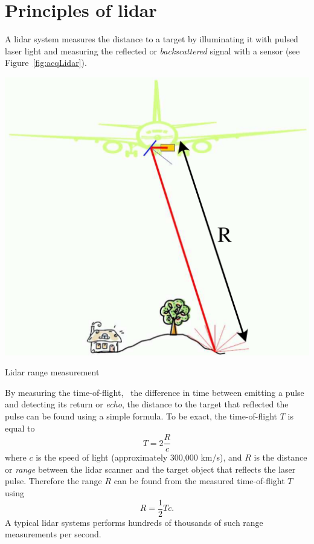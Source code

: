 \section{Principles of lidar}%
\label{sec:lidar-principles}

A lidar system measures the distance to a target by illuminating it with pulsed laser light and measuring the reflected or \emph{backscattered} signal with a sensor (see Figure~\ref{fig:acqLidar}). 
\begin{marginfigure}
	\centering
	\includegraphics[width=\textwidth]{figs/lidar.png}
	\caption{Lidar range measurement}%
	\label{fig:acqLidar}
\end{marginfigure}
By measuring the time-of-flight, \ie\ the difference in time between emitting a pulse and detecting its return or \emph{echo}, the distance to the target that reflected the pulse can be found using a simple formula. To be exact, the time-of-flight $T$ is equal to
\begin{equation}
	\label{eq:tof}
	T= 2 \frac{R}{c}
\end{equation}
where $c$ is the speed of  light (approximately 300,000 km/s), and $R$ is the distance or \emph{range} between the lidar scanner and the target object that reflects the laser pulse. Therefore the range $R$ can be found from the measured time-of-flight $T$ using
\begin{equation*}
	R = \frac{1}{2} Tc.
\end{equation*}
A typical lidar systems performs hundreds of thousands of such range measurements per second. 


